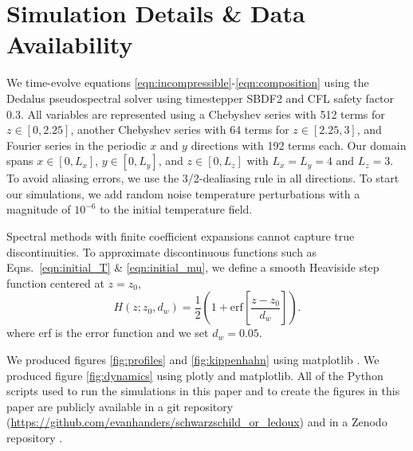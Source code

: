 \section{Simulation Details \& Data Availability}
\label{app:simulation_details}
We time-evolve equations \ref{eqn:incompressible}-\ref{eqn:composition} using the Dedalus pseudospectral solver \citep[git commit 1339061]{burns_etal_2020} using timestepper SBDF2 \citep{wang_ruuth_2008} and CFL safety factor 0.3.
All variables are represented using a Chebyshev series with 512 terms for $z \in [0, 2.25]$, another Chebyshev series with 64 terms for $z \in [2.25, 3]$, and Fourier series in the periodic $x$ and $y$ directions with 192 terms each.
Our domain spans $x \in [0, L_x]$, $y \in [0, L_y]$, and $z \in [0, L_z]$ with $L_x = L_y = 4$ and $L_z = 3$.
To avoid aliasing errors, we use the 3/2-dealiasing rule in all directions.
To start our simulations, we add random noise temperature perturbations with a magnitude of $10^{-6}$ to the initial temperature field.

Spectral methods with finite coefficient expansions cannot capture true discontinuities.
To approximate discontinuous functions such as Eqns.~\ref{eqn:initial_T} \& \ref{eqn:initial_mu}, we define a smooth Heaviside step function centered at $z = z_0$,
\begin{equation}
H(z; z_0, d_w) = \frac{1}{2}\left(1 + \mathrm{erf}\left[\frac{z - z_0}{d_w}\right]\right).
\label{eqn:heaviside}
\end{equation}
where erf is the error function and we set $d_w = 0.05$.

We produced figures \ref{fig:profiles} and \ref{fig:kippenhahn} using matplotlib \citep{hunter2007, mpl3.3.4}.
We produced figure \ref{fig:dynamics} using plotly \citep{plotly} and matplotlib.
All of the Python scripts used to run the simulations in this paper and to create the figures in this paper are publicly available in a git repository (\url{https://github.com/evanhanders/schwarzschild_or_ledoux}) and in a Zenodo repository \citep{supp}.
